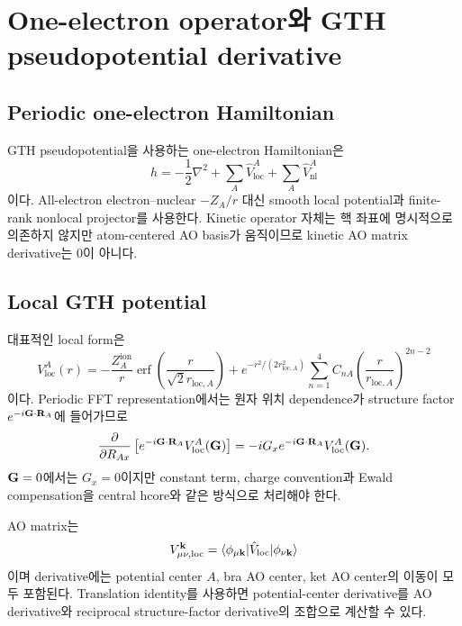 \section{One-electron operator와 GTH pseudopotential derivative}
\label{sec:gth-one-electron}

\subsection{Periodic one-electron Hamiltonian}

GTH pseudopotential을 사용하는 one-electron Hamiltonian은
\begin{equation}
  \hat h
  =-\frac12\nabla^2
   +\sum_A\hat V_{\mathrm{loc}}^A
   +\sum_A\hat V_{\mathrm{nl}}^A
  \label{eq:gth-hamiltonian}
\end{equation}
이다. All-electron electron--nuclear $-Z_A/r$ 대신 smooth local potential과 finite-rank
nonlocal projector를 사용한다. Kinetic operator 자체는 핵 좌표에 명시적으로 의존하지
않지만 atom-centered AO basis가 움직이므로 kinetic AO matrix derivative는 0이 아니다.

\subsection{Local GTH potential}

대표적인 local form은
\begin{equation}
  V_{\mathrm{loc}}^A(r)
  =-\frac{Z_A^{\mathrm{ion}}}{r}
    \operatorname{erf}\!\left(\frac{r}{\sqrt2 r_{\mathrm{loc},A}}\right)
   +e^{-r^2/(2r_{\mathrm{loc},A}^2)}
    \sum_{n=1}^{4}C_{nA}
    \left(\frac{r}{r_{\mathrm{loc},A}}\right)^{2n-2}
  \label{eq:gth-local-real}
\end{equation}
이다. Periodic FFT representation에서는 원자 위치 dependence가 structure factor
$e^{-i\mathbf{G}\cdot\mathbf R_A}$에 들어가므로
\begin{equation}
  \frac{\partial}{\partial R_{Ax}}
  \left[e^{-i\mathbf{G}\cdot\mathbf R_A}V_{\mathrm{loc}}^A(\mathbf{G})\right]
  =-iG_xe^{-i\mathbf{G}\cdot\mathbf R_A}V_{\mathrm{loc}}^A(\mathbf{G}).
  \label{eq:gth-local-structure-derivative}
\end{equation}
$\mathbf{G}=0$에서는 $G_x=0$이지만 constant term, charge convention과 Ewald compensation을
central hcore와 같은 방식으로 처리해야 한다.

AO matrix는
\begin{equation}
  V_{\mu\nu,\mathrm{loc}}^{\mathbf{k}}
  =\langle\phi_{\mu\mathbf{k}}|\hat V_{\mathrm{loc}}|\phi_{\nu\mathbf{k}}\rangle
  \label{eq:gth-local-ao}
\end{equation}
이며 derivative에는 potential center $A$, bra AO center, ket AO center의 이동이 모두
포함된다. Translation identity를 사용하면 potential-center derivative를 AO derivative와
reciprocal structure-factor derivative의 조합으로 계산할 수 있다.

